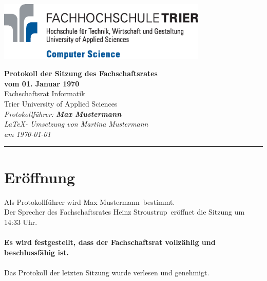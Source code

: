 \documentclass[a4paper, 11pt]{article} %
\newcommand{\protokoller}{Max Mustermann}
\newcommand{\dateOfMeeting}{01. Januar 1970}
\newcommand{\TeXer}{Martina Mustermann}
\newcommand{\fsiPresident}{Heinz Stroustrup}
\begin{document}

\doublespacing
\thispagestyle{empty}

\begin{center}
\includegraphics[width=10.0cm]{../logo_faculty_computer_science.eps}

\vspace*{\fill}
{\LARGE \textbf{Protokoll der Sitzung des Fachschaftsrates \\vom \dateOfMeeting}}\\
Fachschaftsrat Informatik\\
Trier University of Applied Sciences\\
\vspace{2.5cm}
\textit{
	Protokollführer: \textbf{\protokoller} \\
	\LaTeX - Umsetzung von \TeXer\\
	am \today
}
\vfill
\end{center}

\hspace*{-35cm}
\textcolor{fsi}{\rule{64.9cm}{15pt}}
\pagebreak
 
\setcounter{tocdepth}{2}
\tableofcontents 
\pagebreak

\section{Eröffnung}
Als Protokollführer wird \protokoller~bestimmt.\\
Der Sprecher des Fachschaftsrates \fsiPresident~eröffnet die Sitzung um 14:33 Uhr.
\\\\
\textbf{Es wird festgestellt, dass der Fachschaftsrat vollzählig und beschlussfähig ist.}
\\\\
Das Protokoll der letzten Sitzung wurde verlesen und genehmigt.
\end{document}
